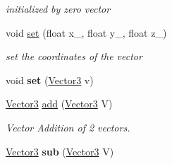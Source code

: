 \begin{DoxyCompactItemize}
\begin{DoxyCompactList}\small\item\em initialized by zero vector \end{DoxyCompactList}\item 
void \hyperlink{class_vector3_a350a53f275853752ebb968f1dd14370a}{set} (float x\+\_\+, float y\+\_\+, float z\+\_\+)
\begin{DoxyCompactList}\small\item\em set the coordinates of the vector \end{DoxyCompactList}\item 
\hypertarget{class_vector3_a3de55a74b495779d2049d4c25770e72d}{void {\bfseries set} (\hyperlink{class_vector3}{Vector3} v)}\label{class_vector3_a3de55a74b495779d2049d4c25770e72d}

\item 
\hyperlink{class_vector3}{Vector3} \hyperlink{class_vector3_a75071ea9be5f22de4d3b6fed7c348d7c}{add} (\hyperlink{class_vector3}{Vector3} V)
\begin{DoxyCompactList}\small\item\em Vector Addition of 2 vectors. \end{DoxyCompactList}\item 
\hypertarget{class_vector3_a59f675ff225d75a745ae9bc711ffbdfa}{\hyperlink{class_vector3}{Vector3} {\bfseries sub} (\hyperlink{class_vector3}{Vector3} V)}\label{class_vector3_a59f675ff225d75a745ae9bc711ffbdfa}


\end{DoxyCompactItemize}
